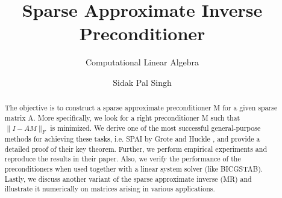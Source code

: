 \documentclass[paper=A4, fontsize=11pt]{scrartcl}
\title{Sparse Approximate Inverse Preconditioner}
\subtitle{Computational Linear Algebra}
\author{Sidak Pal Singh}
\theoremstyle{remark}
\begin{document}
	\maketitle
	\begin{abstract}
	
	
	The objective is to construct a sparse approximate preconditioner M for a given sparse matrix A. More specifically, we look for a right preconditioner M such that $\|I-A M\|_{F}$ is minimized. 
	We derive one of the most successful general-purpose methods for achieving these tasks, i.e. SPAI by Grote and Huckle \cite{grote}, and provide a detailed proof of their key theorem. Further, we perform empirical experiments and reproduce the results in their paper. Also, we verify the performance of the preconditioners when used together with a linear system solver (like BICGSTAB). Lastly, we discuss another variant of the sparse approximate inverse (MR) and illustrate it numerically on matrices arising in various applications.

\end{abstract}

	\newpage
	
\end{document}
